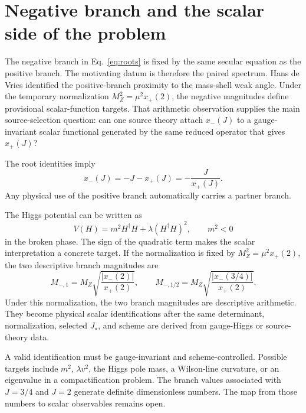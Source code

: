 \section{Negative branch and the scalar side of the problem}
\label{sec:negative}

The negative branch in Eq.~\eqref{eq:roots} is fixed by the same secular equation as the positive branch.  The motivating datum is therefore the paired spectrum.  Hans de Vries identified the positive-branch proximity to the mass-shell weak angle.  Under the temporary normalization \(M_Z^2=\mu^2x_+(2)\), the negative magnitudes define provisional scalar-function targets.  That arithmetic observation supplies the main source-selection question: can one source theory attach \(x_-(J)\) to a gauge-invariant scalar functional generated by the same reduced operator that gives \(x_+(J)\)?

The root identities imply
\begin{equation}
  x_-(J)=-J-x_+(J)=-\frac{J}{x_+(J)}.
  \label{eq:negative-from-positive}
\end{equation}
Any physical use of the positive branch automatically carries a partner branch.

The Higgs potential can be written as
\begin{equation}
  V(H)=m^2 H^\dagger H+\lambda (H^\dagger H)^2,
  \qquad m^2<0
  \label{eq:higgs-potential}
\end{equation}
in the broken phase.  The sign of the quadratic term makes the scalar interpretation a concrete target.  If the normalization is fixed by \(M_Z^2=\mu^2 x_+(2)\), the two descriptive branch magnitudes are
\begin{equation}
  M_{-,1} = M_Z\sqrt{\frac{|x_-(2)|}{x_+(2)}},
  \qquad
  M_{-,1/2} = M_Z\sqrt{\frac{|x_-(3/4)|}{x_+(2)}} .
  \label{eq:negative-scales}
\end{equation}
Under this normalization, the two branch magnitudes are descriptive arithmetic.  They become physical scalar identifications after the same determinant, normalization, selected \(J_\star\), and scheme are derived from gauge-Higgs or source-theory data.

A valid identification must be gauge-invariant and scheme-controlled.  Possible targets include \(m^2\), \(\lambda v^2\), the Higgs pole mass, a Wilson-line curvature, or an eigenvalue in a compactification problem.  The branch values associated with \(J=3/4\) and \(J=2\) generate definite dimensionless numbers.  The map from those numbers to scalar observables remains open.


